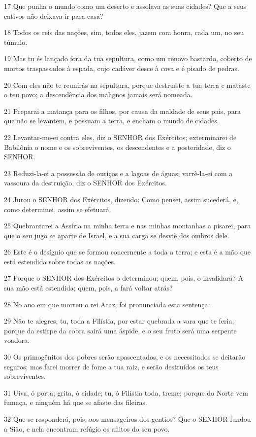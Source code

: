 \par 17 Que punha o mundo como um deserto e assolava as suas cidades? Que a seus cativos não deixava ir para casa?
\par 18 Todos os reis das nações, sim, todos eles, jazem com honra, cada um, no seu túmulo.
\par 19 Mas tu és lançado fora da tua sepultura, como um renovo bastardo, coberto de mortos traspassados à espada, cujo cadáver desce à cova e é pisado de pedras.
\par 20 Com eles não te reunirás na sepultura, porque destruíste a tua terra e mataste o teu povo; a descendência dos malignos jamais será nomeada.
\par 21 Preparai a matança para os filhos, por causa da maldade de seus pais, para que não se levantem, e possuam a terra, e encham o mundo de cidades.
\par 22 Levantar-me-ei contra eles, diz o SENHOR dos Exércitos; exterminarei de Babilônia o nome e os sobreviventes, os descendentes e a posteridade, diz o SENHOR.
\par 23 Reduzi-la-ei a possessão de ouriços e a lagoas de águas; varrê-la-ei com a vassoura da destruição, diz o SENHOR dos Exércitos.
\par 24 Jurou o SENHOR dos Exércitos, dizendo: Como pensei, assim sucederá, e, como determinei, assim se efetuará.
\par 25 Quebrantarei a Assíria na minha terra e nas minhas montanhas a pisarei, para que o seu jugo se aparte de Israel, e a sua carga se desvie dos ombros dele.
\par 26 Este é o desígnio que se formou concernente a toda a terra; e esta é a mão que está estendida sobre todas as nações.
\par 27 Porque o SENHOR dos Exércitos o determinou; quem, pois, o invalidará? A sua mão está estendida; quem, pois, a fará voltar atrás?
\par 28 No ano em que morreu o rei Acaz, foi pronunciada esta sentença:
\par 29 Não te alegres, tu, toda a Filístia, por estar quebrada a vara que te feria; porque da estirpe da cobra sairá uma áspide, e o seu fruto será uma serpente voadora.
\par 30 Os primogênitos dos pobres serão apascentados, e os necessitados se deitarão seguros; mas farei morrer de fome a tua raiz, e serão destruídos os teus sobreviventes.
\par 31 Uiva, ó porta; grita, ó cidade; tu, ó Filístia toda, treme; porque do Norte vem fumaça, e ninguém há que se afaste das fileiras.
\par 32 Que se responderá, pois, aos mensageiros dos gentios? Que o SENHOR fundou a Sião, e nela encontram refúgio os aflitos do seu povo.

